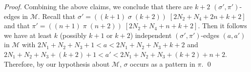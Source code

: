 \documentclass[a4paper]{llncs}
\begin{document}
\begin{proof}
  Combining the above claims, we conclude that there are
  $k+2$ $(\sigma', \pi')$-edges in $\mathcal{M}$.
  Recall that
  $\sigma' = ((k+1) \; \sigma \; (k+2)) \; [2N_2 + N_4 + 2n + k + 2]$ and that
  $\pi' = ((n+1) \; \pi \; (n+2)) \; [2N_2 + N_4 + n + k + 2]$.
  Then it follows we have
  at least $k$ (possibly $k+1$ or $k+2$) independent $(\sigma', \pi')$-edges
  $(a, a')$ in $\mathcal{M}$ with
  $2N_1 + N_2 + N_3 + 1 < a < 2N_1 + N_2 + N_3 + k + 2$
  and
  $2N_1 + N_2 + N_3 + (k + 2) + 1 < a' < 2N_1 + N_2 + N_3 + (k + 2) + n + 2$.
  Therefore, by our hypothesis about $\mathcal{M}$,
  $\sigma$ occurs as a pattern in $\pi$.
  \qed
\end{proof}


%
%
%
%
\end{document}
